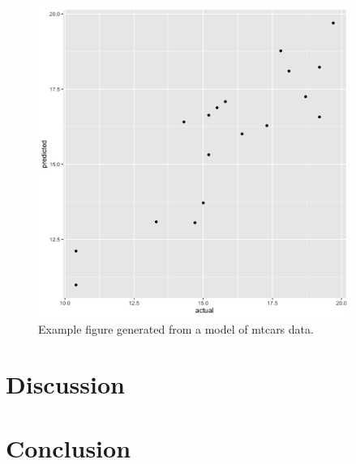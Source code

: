 \documentclass[12pt]{article}
\begin{document}
\begin{figure}[htbp]
    \centering
    \includegraphics[width=4in]{figures/mpg_model_actual_vs_predicted.png}
    \caption{Example figure generated from a model of mtcars data.}
    \label{fig:mtcars_model}
\end{figure}



\section{Discussion}
\section{Conclusion}
% 
\end{document}
